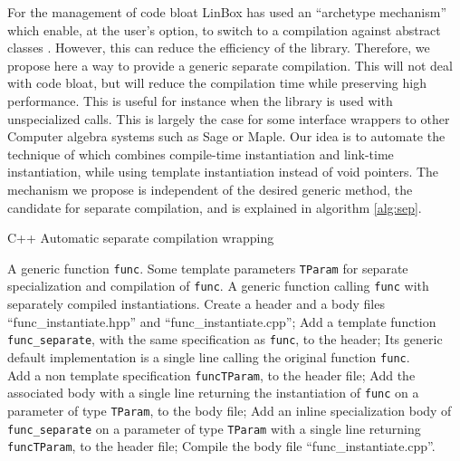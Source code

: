 \documentclass[runningheads,a4paper]{llncs}
\newcommand{\linbox}{{\sc LinBox}\xspace}
\begin{document}
For the management of code bloat \linbox has used an ``archetype
mechanism'' which enable, at the user's option, to switch to a
compilation against abstract classes \cite[\S 2.1]{jgd:2002:icms}.
However, this can reduce the efficiency of the library. Therefore, we propose
here a way to provide a generic separate compilation. This will not
deal with code bloat, but will reduce the compilation time while
preserving high performance.
This is useful for instance when the library is used with
unspecialized calls. This is largely the case for some interface
wrappers to other Computer algebra systems such as {\sc Sage} or {\sc Maple}.
Our idea is to automate the technique of
\cite{Erlingsson:1996:issac} which combines compile-time instantiation
and link-time instantiation, while using template instantiation
instead of void pointers.
The mechanism we propose is independent of the desired generic method,
the candidate
for separate compilation, and is explained in algorithm \ref{alg:sep}.
\begin{algorithm}[ht]
\caption{C++ Automatic separate compilation wrapping}\label{alg:sep}
\begin{algorithmic}[1]
\REQUIRE A generic function \texttt{func}.
\REQUIRE Some template parameters \texttt{TParam} for separate specialization and
compilation of \texttt{func}.
\ENSURE A generic function calling
\texttt{func} with separately compiled instantiations.
\STATE Create a header and a body files ``func\_instantiate.hpp'' and ``func\_instantiate.cpp'';
\STATE Add a template function \texttt{func\_separate}, with the same
specification as \texttt{func}, to the header;
\STATE Its generic default implementation is a single line calling the
original function \texttt{func}.\\ 
  \STATE Add  a non template specification
  \texttt{funcTParam}, to the header file;
  \STATE Add the associated body with a
  single line returning the instantiation of
  \texttt{func} on a parameter of type \texttt{TParam}, to the body file;
  \STATE Add an inline specialization
  body of \texttt{func\_separate} on a parameter of type
  \texttt{TParam} with a single line returning \texttt{funcTParam}, to
  the header file; 
\ENDFOR
\STATE Compile the body file ``func\_instantiate.cpp''.
\end{algorithmic}
\end{algorithm}
\end{document}
